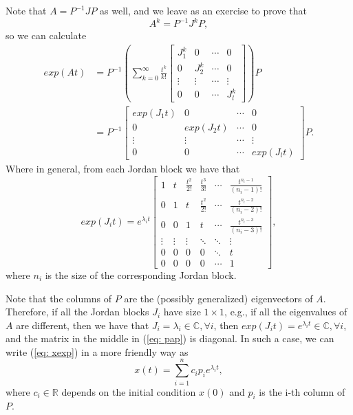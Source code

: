 \documentclass[11pt,a4paper,titlepage]{article}
\begin{document}
Note that $A = P^{-1}JP$ as well, and we leave as an exercise to prove that
\begin{equation}
	A^k = P^{-1} J^k P,
\end{equation}
so we can calculate
\begin{align}
	exp(At) &= P^{-1}\left(\sum_{k=0}^\infty \frac{t^k}{k!} \begin{bmatrix}J_1^k & 0 & \cdots & 0 \\ 0 & J_2^k & \cdots & 0 \\ \vdots & \vdots & \cdots & \vdots \\ 0 & 0 & \cdots & J_l^k \end{bmatrix} \right) P \nonumber \\
		&= P^{-1} \begin{bmatrix}exp(J_1t) & 0 & \cdots & 0 \\ 0 & exp(J_2t) & \cdots & 0 \\ \vdots & \vdots & \cdots & \vdots \\ 0 & 0 & \cdots & exp(J_lt) \end{bmatrix} P. \label{eq: pap}
\end{align}
Where in general, from each Jordan block we have that
\begin{equation}
	exp(J_it) = e^{\lambda_i t}
	\begin{bmatrix}1 & t & \frac{t^2}{2!} & \frac{t^3}{3!} & \cdots & \frac{t^{n_i-1}}{(n_i-1)!} \\
		0 & 1 & t & \frac{t^2}{2!} & \cdots & \frac{t^{n_i-2}}{(n_i-2)!} \\
		0 & 0 & 1 & t & \cdots & \frac{t^{n_i-3}}{(n_i-3)!} \\
	\vdots & \vdots & \vdots & \ddots & \ddots & \vdots \\
	0 & 0 & 0 & 0 & \ddots & t \\
	0 & 0 & 0 & 0 & \cdots & 1
	\end{bmatrix}, \label{eq: jit}
\end{equation}
where $n_i$ is the size of the corresponding Jordan block.

Note that the columns of $P$ are the (possibly generalized) eigenvectors of $A$. Therefore, if all the Jordan blocks $J_i$ have size $1\times 1$, e.g., if all the eigenvalues of $A$ are different, then we have that $J_i = \lambda_i \in \mathbb{C}, \forall i$, then $exp(J_it) = e^{\lambda_it} \in\mathbb{C}, \forall i$, and the matrix in the middle in (\ref{eq: pap}) is diagonal. In such a case, we can write (\ref{eq: xexp}) in a more friendly way as
\begin{equation}
	x(t) = \sum_{i=1}^n c_i p_i e^{\lambda_i t},
\end{equation}
where $c_i\in\mathbb{R}$ depends on the initial condition $x(0)$ and $p_i$ is the i-th column of $P$.
\end{document}
